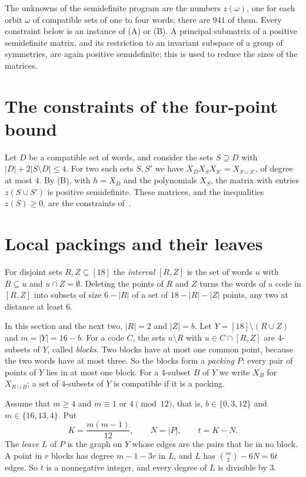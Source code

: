 \documentclass[11pt,a4paper]{article}
\newcommand{\abs}[1]{\lvert #1\rvert}
\begin{document}
The unknowns of the semidefinite program are the numbers $z(\omega)$, one
for each orbit $\omega$ of compatible sets of one to four words; there are
$941$ of them. Every constraint below is an instance of (A) or (B). A
principal submatrix of a positive semidefinite matrix, and its restriction
to an invariant subspace of a group of symmetries, are again positive
semidefinite; this is used to reduce the sizes of the matrices.

\section{The constraints of the four-point bound}

Let $D$ be a compatible set of words, and consider the sets $S\supseteq D$
with $\abs D+2\abs{S\setminus D}\le 4$. For two such sets $S,S'$ we have
$X_DX_SX_{S'}=X_{S\cup S'}$, of degree at most $4$. By (B), with $h=X_D$ and
the polynomials $X_S$, the matrix with entries $z(S\cup S')$ is positive
semidefinite. These matrices, and the inequalities $z(S)\ge 0$, are the
constraints of~\cite{Polak}.

\section{Local packings and their leaves}

For disjoint sets $R,Z\subseteq[18]$ the \emph{interval} $[R,Z]$ is the set
of words $u$ with $R\subseteq u$ and $u\cap Z=\emptyset$. Deleting the
points of $R$ and $Z$ turns the words of a code in $[R,Z]$ into subsets of
size $6-\abs R$ of a set of $18-\abs R-\abs Z$ points, any two at distance
at least $6$.

In this section and the next two, $\abs R=2$ and $\abs Z=b$. Let
$Y=[18]\setminus(R\cup Z)$ and $m=\abs Y=16-b$. For a code $C$, the sets
$u\setminus R$ with $u\in C\cap[R,Z]$ are $4$-subsets of $Y$, called
\emph{blocks}. Two blocks have at most one common point, because the two
words have at most three. So the blocks form a \emph{packing} $P$: every
pair of points of $Y$ lies in at most one block. For a $4$-subset $B$ of
$Y$ we write $X_B$ for $X_{R\cup B}$; a set of $4$-subsets of $Y$ is
compatible if it is a packing.

Assume that $m\ge 4$ and $m\equiv 1$ or $4\pmod{12}$, that is, $b\in\{0,3,12\}$ and
$m\in\{16,13,4\}$. Put
\[
K=\frac{m(m-1)}{12},\qquad N=\abs P,\qquad t=K-N .
\]
The \emph{leave} $L$ of $P$ is the graph on $Y$ whose edges are the pairs
that lie in no block. A point in $r$ blocks has degree $m-1-3r$ in $L$, and
$L$ has $\binom m2-6N=6t$ edges. So $t$ is a nonnegative integer, and
every degree of $L$ is divisible by $3$.
\end{document}
